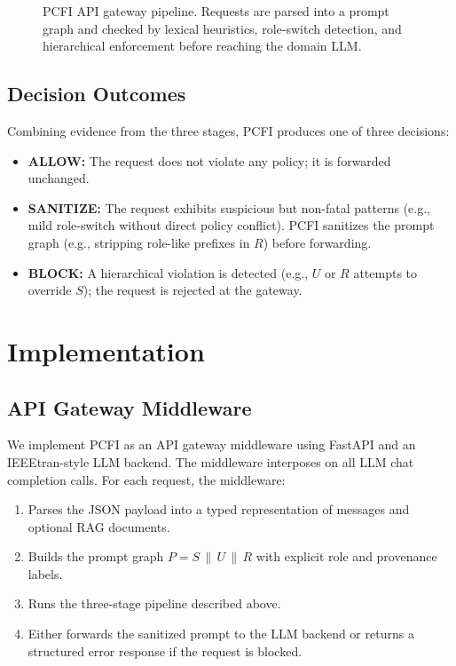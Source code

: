 \documentclass[conference]{IEEEtran}
\begin{document}
\begin{figure}[t]
\centering
\resizebox{\linewidth}{!}{}
\caption{PCFI API gateway pipeline. Requests are parsed into a prompt graph and checked by lexical heuristics, role-switch detection, and hierarchical enforcement before reaching the domain LLM.}
\label{fig:design_pipeline}
\end{figure}

\subsection{Decision Outcomes}

Combining evidence from the three stages, PCFI produces one of three decisions:
\begin{itemize}
  \item \textbf{ALLOW:} The request does not violate any policy; it is forwarded unchanged.
  \item \textbf{SANITIZE:} The request exhibits suspicious but non-fatal patterns (e.g., mild role-switch without direct policy conflict). PCFI sanitizes the prompt graph (e.g., stripping role-like prefixes in $R$) before forwarding.
  \item \textbf{BLOCK:} A hierarchical violation is detected (e.g., $U$ or $R$ attempts to override $S$); the request is rejected at the gateway.
\end{itemize}

\section{Implementation}

\subsection{API Gateway Middleware}

We implement PCFI as an API gateway middleware using FastAPI and an IEEEtran-style LLM backend. The middleware interposes on all LLM chat completion calls. For each request, the middleware:
\begin{enumerate}
  \item Parses the JSON payload into a typed representation of messages and optional RAG documents.
  \item Builds the prompt graph $P = S \,\|\, U \,\|\, R$ with explicit role and provenance labels.
  \item Runs the three-stage pipeline described above.
  \item Either forwards the sanitized prompt to the LLM backend or returns a structured error response if the request is blocked.
\end{enumerate}
\end{document}
